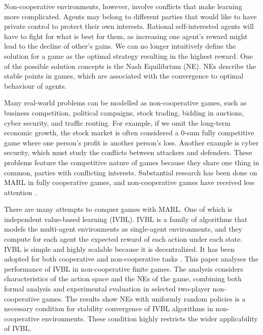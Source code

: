 \documentclass[]{interact}
\theoremstyle{plain}%
\theoremstyle{definition}
\theoremstyle{remark}
\begin{document}
Non-cooperative environments, however, involve conflicts that make learning more complicated. Agents may belong to different parties that would like to have private control to protect their own interests. Rational self-interested agents will have to fight for what is best for them, as increasing one agent's reward might lead to the decline of other's gains. We can no longer intuitively define the solution for a game as the optimal strategy resulting in the highest reward. One of the possible solution concepts is the Nash Equilibrium (NE). NEs describe the stable points in games, which are associated with the convergence to optimal behaviour of agents.

Many real-world problems can be modelled as non-cooperative games, such as business competition, political campaigns, stock trading, bidding in auctions, cyber security, and traffic routing. For example, if we omit the long-term economic growth, the stock market is often considered a 0-sum fully competitive game where one person's profit is another person's loss. Another example is cyber security, which must study the conflicts between attackers and defenders. These problems feature the competitive nature of games because they share one thing in common, parties with conflicting interests. Substantial research has been done on MARL in fully cooperative games, and non-cooperative games have received less attention \cite{zhu2024survey, li2024fightladder}.

There are many attempts to conquer games with MARL. One of which is independent value-based learning (IVBL). IVBL is a family of algorithms that models the multi-agent environments as single-agent environments, and they compute for each agent the expected reward of each action under each state. IVBL is simple and highly scalable because it is decentralized. It has been adopted for both cooperative \cite{foerster2017stabilising, omidshafiei2017deep, palmer2017lenient, palmer2018negative} and non-cooperative tasks \cite{bjornsson2009cadiaplayer, jiang2018q, qu2020distributed, kopacz2023evaluating}. This paper analyses the performance of IVBL in non-cooperative finite games. The analysis considers characteristics of the action space and the NEs of the game, combining both formal analysis and experimental evaluation in selected two-player non-cooperative games. The results show NEs with uniformly random policies is a necessary condition for stability convergence of IVBL algorithms in non-cooperative environments. These condition highly restricts the wider applicability of IVBL.
\end{document}
